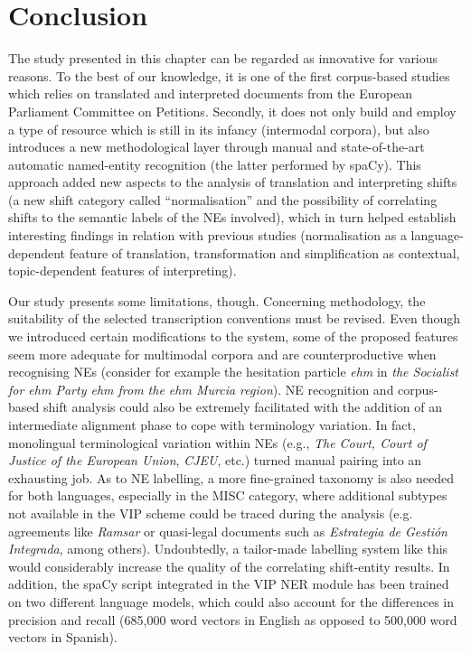 \documentclass[output=paper]{langscibook}
\begin{document}
\section{Conclusion}\label{sec:corpas:7}

The study presented in this chapter can be regarded as innovative for various reasons. To the best of our knowledge, it is one of the first corpus-based studies which relies on translated and interpreted documents from the European Parliament Committee on Petitions. Secondly, it does not only build and employ a type of resource which is still in its infancy (intermodal corpora), but also introduces a new methodological layer through manual and state-of-the-art automatic named-entity recognition (the latter performed by spaCy). This approach added new aspects to the analysis of translation and interpreting shifts (a new shift category called “normalisation” and the possibility of correlating shifts to the semantic labels of the NEs involved), which in turn helped establish interesting findings in relation with previous studies (normalisation as a language-dependent feature of translation, transformation and simplification as contextual, topic-dependent features of interpreting).

\begin{sloppypar}
Our study presents some limitations, though. Concerning methodology, the suitability of the selected transcription conventions must be revised. Even though we introduced certain modifications to the system, some of the proposed features seem more adequate for multimodal corpora and are counterproductive when recognising NEs (consider for example the hesitation particle \textit{ehm} in \textit{the Socialist for ehm Party ehm from the ehm Murcia region}).  NE recognition and corpus-based shift analysis could also be extremely facilitated with the addition of an intermediate alignment phase to cope with terminology variation. In fact, monolingual terminological variation within NEs (e.g., \textit{The Court, Court of Justice of the European Union}, \textit{CJEU}, etc.) turned manual pairing into an exhausting job. As to NE labelling, a more fine-grained taxonomy is also needed for both languages, especially in the MISC category, where additional subtypes not available in the VIP scheme could be traced during the analysis (e.g. agreements like \textit{Ramsar} or quasi-legal documents such as \textit{Estrategia de Gestión Integrada}, among others). Undoubtedly, a tailor-made labelling system like this would considerably increase the quality of the correlating shift-entity results. In addition, the spaCy script integrated in the VIP NER module has been trained on two different language models, which could also account for the differences in precision and recall (685,000 word vectors in English as opposed to 500,000 word vectors in Spanish). 
\end{sloppypar}
\end{document}
